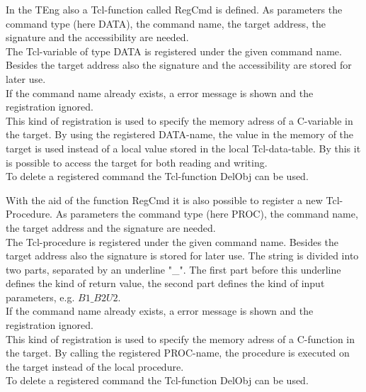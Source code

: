 In the TEng also a Tcl-function called RegCmd is defined.
As parameters the command type (here DATA), the command name, the target address, the signature and the accessibility are needed.
\\
The Tcl-variable of type DATA is registered under the given command name. Besides the target address also the signature and the accessibility are stored for later use.
\\
If the command name already exists, a error message is shown and the registration ignored.
\\
This kind of registration is used to specify the memory adress of a C-variable in the target. By using the registered DATA-name, the value in the memory of the target is used instead of a local value stored in the local Tcl-data-table. By this it is possible to access the target for both reading and writing.
\\
To delete a registered command the Tcl-function DelObj can be used.








With the aid of the function RegCmd it is also possible to register a new Tcl-Procedure.
As parameters the command type (here PROC), the command name, the target address and the signature are needed.
\\
The Tcl-procedure is registered under the given command name. Besides the target address also the signature is stored for later use. The string is divided into two parts, separated by an underline "\_". The first part before this underline defines the kind of return value, the second part defines the kind of input parameters, e.g. \(B1\_B2U2\).
\\
If the command name already exists, a error message is shown and the registration ignored.
\\
This kind of registration is used to specify the memory adress of a C-function in the target. By calling the registered PROC-name, the procedure is executed on the target instead of the local procedure.
\\
To delete a registered command the Tcl-function DelObj can be used.










